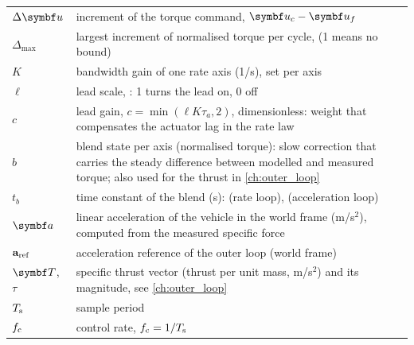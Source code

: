 \begin{table}[tbp]
\begin{tabularx}{\textwidth}{@{}l Y@{}}
$\Delta\vect u$ & increment of the torque command, $\vect u_c-\vect u_f$ \\
$\Delta_{\max}$ & largest increment of normalised torque per cycle,  (1 means no bound) \\
$K$ & bandwidth gain of one rate axis (1/s), set per axis \\
$\ell$ & lead scale, : 1 turns the lead on, 0 off \\
$c$ & lead gain, $c=\min(\ell K\tau_a,2)$, dimensionless: weight that compensates the actuator lag in the rate law \\
$b$ & blend state per axis (normalised torque): slow correction that carries the steady difference between modelled and measured torque; also used for the thrust in \cref{ch:outer_loop} \\
$t_b$ & time constant of the blend (s):  (rate loop),  (acceleration loop) \\
$\vect a$ & linear acceleration of the vehicle in the world frame (m/s$^2$), computed from the measured specific force \\
$\mathbf{a}_{\mathrm{ref}}$ & acceleration reference of the outer loop (world frame) \\
$\vect T$, $\tau$ & specific thrust vector (thrust per unit mass, m/s$^2$) and its magnitude, see \cref{ch:outer_loop} \\
$T_{\mathrm{s}}$ & sample period \\
$f_{\mathrm{c}}$ & control rate, $f_{\mathrm{c}} = 1/T_{\mathrm{s}}$ \\
\bottomrule
\end{tabularx}
\end{table}
